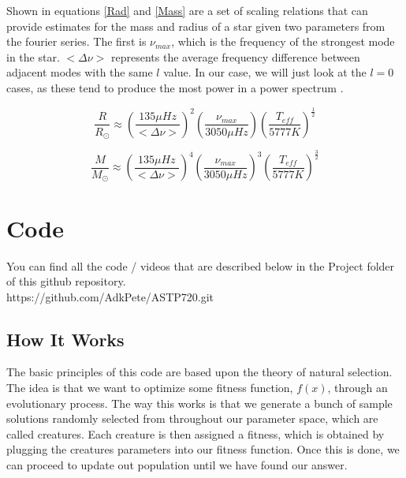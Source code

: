 \documentclass[twocolumn]{aastex63}
\begin{document}
Shown in equations \ref{Rad} and \ref{Mass} are a set of scaling relations that can provide estimates for the mass and radius of a star given two parameters from the fourier series. The first is $\nu_{max}$, which is the frequency of the strongest mode in the star. $< \Delta \nu > $ represents the average frequency difference between adjacent modes with the same $l$ value. In our case, we will just look at the $l = 0$ cases, as these tend to produce the most power in a power spectrum \citep{Kjeldsen} \citep{scaling}.

\begin{equation}\label{Rad}
\frac{R}{R_\odot} \approx \left(\frac{135 \mu Hz}{<\Delta \nu>}\right)^2 \left( \frac{\nu_{max}}{3050 \mu Hz} \right) \left(\frac{T_{eff}}{5777 K}\right) ^{\frac{1}{2}}
\end{equation}

\begin{equation}\label{Mass}
\frac{M}{M_\odot} \approx \left(\frac{135 \mu Hz}{<\Delta \nu>}\right)^4 \left( \frac{\nu_{max}}{3050 \mu Hz} \right)^3 \left(\frac{T_{eff}}{5777 K}\right) ^{\frac{3}{2}}
\end{equation}

\section {Code}

You can find all the code / videos that are described below in the Project folder of this github repository.\\

https://github.com/AdkPete/ASTP720.git



\subsection{How It Works}

The basic principles of this code are based upon the theory of natural selection. The idea is that we want to optimize some fitness function, $f(x)$, through an evolutionary process. The way this works is that we generate a bunch of sample solutions randomly selected from throughout our parameter space, which are called creatures. Each creature is then assigned a fitness, which is obtained by plugging the creatures parameters into our fitness function. Once this is done,  we can proceed to update out population until we have found our answer.\\
\end{document}
